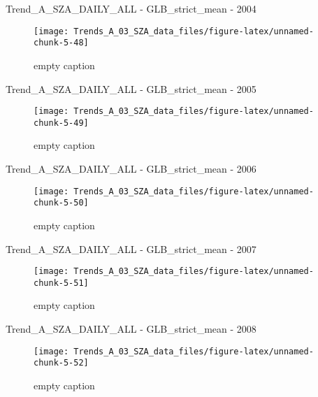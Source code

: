 \documentclass[
  10pt,
  a4paper,oneside]{article}
\begin{document}
Trend\_A\_SZA\_DAILY\_ALL - GLB\_strict\_mean - 2004

\begin{figure}[!ht]

{\centering \texttt{[image: Trends\_A\_03\_SZA\_data\_files/figure-latex/unnamed-chunk-5-48]} 

}

\caption{ empty caption }\label{fig:unnamed-chunk-5-48}
\end{figure}

Trend\_A\_SZA\_DAILY\_ALL - GLB\_strict\_mean - 2005

\begin{figure}[!ht]

{\centering \texttt{[image: Trends\_A\_03\_SZA\_data\_files/figure-latex/unnamed-chunk-5-49]} 

}

\caption{ empty caption }\label{fig:unnamed-chunk-5-49}
\end{figure}

Trend\_A\_SZA\_DAILY\_ALL - GLB\_strict\_mean - 2006

\begin{figure}[!ht]

{\centering \texttt{[image: Trends\_A\_03\_SZA\_data\_files/figure-latex/unnamed-chunk-5-50]} 

}

\caption{ empty caption }\label{fig:unnamed-chunk-5-50}
\end{figure}

Trend\_A\_SZA\_DAILY\_ALL - GLB\_strict\_mean - 2007

\begin{figure}[!ht]

{\centering \texttt{[image: Trends\_A\_03\_SZA\_data\_files/figure-latex/unnamed-chunk-5-51]} 

}

\caption{ empty caption }\label{fig:unnamed-chunk-5-51}
\end{figure}

Trend\_A\_SZA\_DAILY\_ALL - GLB\_strict\_mean - 2008

\begin{figure}[!ht]

{\centering \texttt{[image: Trends\_A\_03\_SZA\_data\_files/figure-latex/unnamed-chunk-5-52]} 

}

\caption{ empty caption }\label{fig:unnamed-chunk-5-52}
\end{figure}
\end{document}
